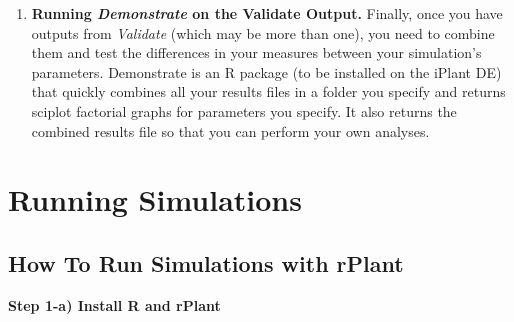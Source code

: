 \documentclass[twoside,a4paper]{refart}
\begin{document}
\begin{enumerate}
\vspace{-1.3mm}
\item \textbf{Running \textit{Demonstrate} on the Validate Output.}
Finally, once you have outputs from \textit{Validate} (which may be more than one), you need to combine them and test the differences in your measures between your simulation's parameters. Demonstrate is an R package (to be installed on the iPlant DE) that quickly combines all your results files in a folder you specify and returns sciplot factorial graphs for parameters you specify. It also returns the combined results file so that you can perform your own analyses.
\end{enumerate}

\section{Running Simulations}


\subsection{How To Run Simulations with rPlant}

\textbf{Step 1-a) Install R and rPlant}
\end{document}
